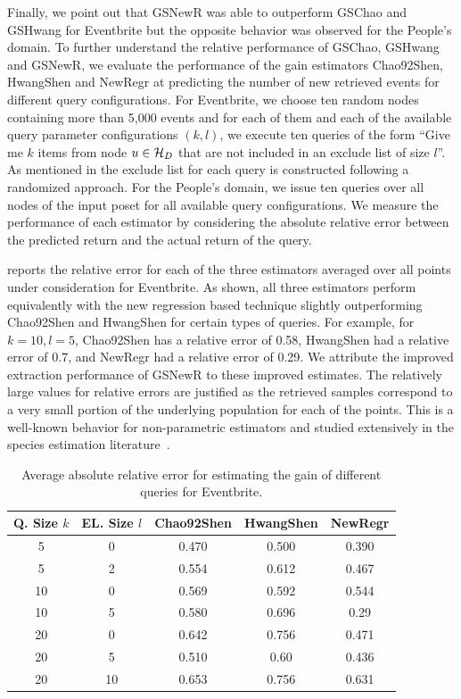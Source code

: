 \vspace{2pt}
Finally, we point out that GSNewR was able to outperform GSChao and GSHwang for Eventbrite but the opposite behavior was observed for the People's domain. To further understand the relative performance of GSChao, GSHwang and GSNewR, we evaluate the performance of the gain estimators Chao92Shen, HwangShen and NewRegr at predicting the number of new retrieved events for different query configurations. For Eventbrite, we choose ten random nodes containing more than 5,000 events and for each of them and each of the available query parameter configurations $(k,l)$, we execute ten queries of the form ``Give me $k$ items from node $u \in \mathcal{H}_D$ that are not included in an exclude list of size $l$''. As mentioned in  the exclude list for each query is constructed following a randomized approach.  For the People's domain, we issue ten queries over all nodes of the input poset for all available query configurations.  We measure the performance of each estimator by considering the absolute relative error between the predicted return and the actual return of the query. 

 reports the relative error for each of the three estimators averaged over all points under consideration for Eventbrite. As shown, all three estimators perform equivalently with the new regression based technique slightly outperforming Chao92Shen and HwangShen for certain types of queries. For example, for $k = 10, l = 5$, Chao92Shen has a relative error of 0.58, HwangShen had a relative error of 0.7, and NewRegr had a relative error of 0.29. We attribute the improved extraction performance of GSNewR to these improved estimates. The relatively large values for relative errors are justified as the retrieved samples correspond to a very small portion of the underlying population for each of the points. This is a well-known behavior for non-parametric estimators and studied extensively in the species estimation literature~\cite{hwang:2010}. 

\begin{table}
\scriptsize\center
\caption{Average absolute relative error for estimating the gain of different queries for Eventbrite.}
\label{tab:eventesterror}
\begin{tabular}{|c|c|c|c|c|}
\hline
\textbf{Q. Size $k$} & \textbf{EL. Size $l$} & \textbf{Chao92Shen} & \textbf{HwangShen} & \textbf{NewRegr} \\ \hline
5 & 0 & 0.470 & 0.500 & 0.390 \\
5 & 2 & 0.554 & 0.612 & 0.467\\
10 & 0 & 0.569 & 0.592 & 0.544\\
10 & 5 & 0.580 & 0.696 & 0.29\\
20 & 0 & 0.642 & 0.756 &0.471\\
20 & 5 & 0.510 & 0.60 & 0.436 \\
20 & 10 & 0.653 & 0.756 & 0.631\\
\hline
\end{tabular}
\vspace{-10pt}
\end{table}


